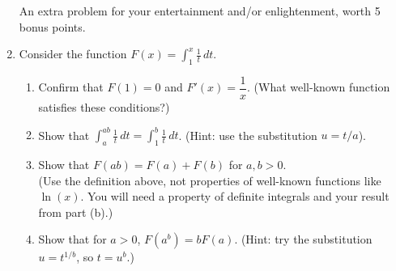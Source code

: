 \documentclass[12pt]{article}
\newcommand{\di}{\displaystyle}
\begin{document}
\begin{enumerate}
\noindent An extra problem for your entertainment and/or enlightenment, worth 5 bonus points.

\bigskip
\item Consider the function $\di F(x) = \int_1^x \frac{1}{t}\,dt$.
\begin{enumerate}
\item Confirm that $F(1)=0$ and $F'(x) = \dfrac{1}{x}$. (What well-known function satisfies these conditions?)



\item Show that $\di \int_a^{ab} \frac{1}{t}\,dt = \int_1^b \frac{1}{t}\,dt$. (Hint: use the substitution $u=t/a$).


\item Show that $F(ab)=F(a)+F(b)$ for $a,b>0$. \\
(Use the definition above, not properties of well-known functions like $\ln(x)$. You will need a property of definite integrals and your result from part (b).)


\item Show that for $a>0$, $F(a^b) = bF(a)$. 
(Hint: try the substitution $u=t^{1/b}$, so $t=u^b$.)
\end{enumerate}
\end{enumerate}
\end{document}
